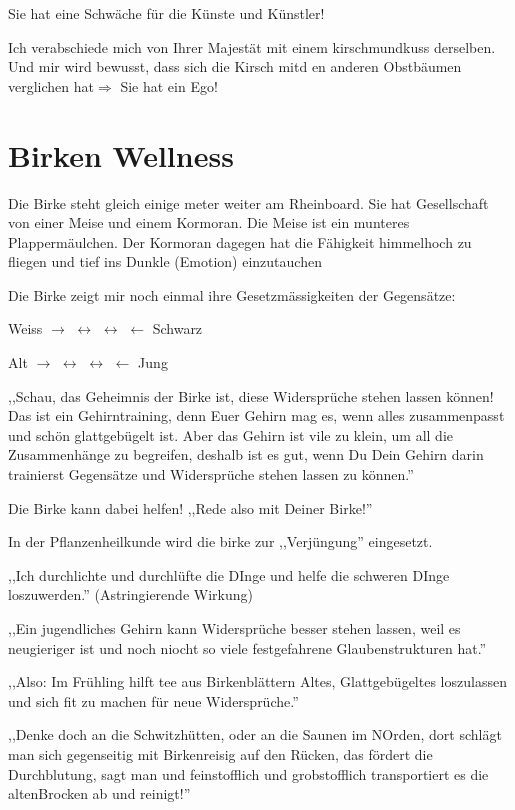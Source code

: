 \documentclass[11pt,titlepage,a5paper]{book}
\begin{document}
Sie hat eine Schwäche für die Künste und Künstler!

Ich verabschiede mich von Ihrer Majestät mit einem kirschmundkuss derselben. Und mir wird bewusst, dass sich die Kirsch mitd en anderen Obstbäumen verglichen hat$\Rightarrow$ Sie hat ein Ego!

\section*{Birken Wellness \textarc{[\withlines]} }

Die Birke steht gleich einige meter weiter am Rheinboard. Sie hat Gesellschaft von einer Meise und einem Kormoran. Die Meise ist ein munteres Plappermäulchen. Der Kormoran dagegen hat die Fähigkeit himmelhoch zu fliegen und tief ins Dunkle (Emotion) einzutauchen

Die Birke zeigt mir noch einmal ihre Gesetzmässigkeiten der Gegensätze:

Weiss $\rightarrow$ $\leftrightarrow$  $\leftrightarrow$ $\leftarrow$ Schwarz


Alt $\rightarrow$ $\leftrightarrow$  $\leftrightarrow$ $\leftarrow$ Jung

,,Schau, das Geheimnis der Birke ist, diese Widersprüche stehen lassen können! Das ist ein Gehirntraining, denn Euer Gehirn mag es, wenn alles zusammenpasst und schön glattgebügelt ist. Aber das Gehirn ist vile zu klein, um all die Zusammenhänge zu begreifen, deshalb ist es gut, wenn Du Dein Gehirn darin trainierst Gegensätze und Widersprüche stehen lassen zu können.''

Die Birke kann dabei helfen! ,,Rede also mit Deiner Birke!'' 

In der Pflanzenheilkunde wird die birke zur ,,Verjüngung'' eingesetzt.

,,Ich durchlichte und durchlüfte die DInge und helfe die schweren DInge loszuwerden.'' (Astringierende Wirkung)

,,Ein jugendliches Gehirn kann Widersprüche besser stehen lassen, weil es neugieriger ist und noch niocht so viele festgefahrene Glaubenstrukturen hat.''


,,Also: Im Frühling hilft tee aus Birkenblättern Altes, Glattgebügeltes loszulassen und sich fit zu machen für neue Widersprüche.''

,,Denke doch an die Schwitzhütten, oder an die Saunen im NOrden, dort schlägt man sich gegenseitig mit Birkenreisig auf den Rücken, das fördert die Durchblutung, sagt man und feinstofflich und grobstofflich transportiert es die altenBrocken ab und reinigt!''
\end{document}
